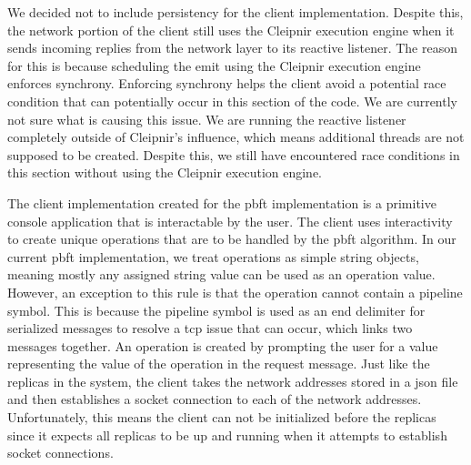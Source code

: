 We decided not to include persistency for the client implementation. Despite this, the network portion of the client still uses the Cleipnir execution engine when it sends incoming replies from the network layer to its reactive listener. The reason for this is because scheduling the emit using the Cleipnir execution engine enforces synchrony. Enforcing synchrony helps the client avoid a potential race condition that can potentially occur in this section of the code. We are currently not sure what is causing this issue. We are running the reactive listener completely outside of Cleipnir’s influence, which means additional threads are not supposed to be created. Despite this, we still have encountered race conditions in this section without using the Cleipnir execution engine.
\fi

The client implementation created for the \ac{pbft} implementation is a primitive console application that is interactable by the user. The client uses interactivity to create unique operations that are to be handled by the \ac{pbft} algorithm. In our current \ac{pbft} implementation, we treat operations as simple string objects, meaning mostly any assigned string value can be used as an operation value. However, an exception to this rule is that the operation cannot contain a pipeline symbol. This is because the pipeline symbol is used as an end delimiter for serialized messages to resolve a \ac{tcp} issue that can occur, which links two messages together. An operation is created by prompting the user for a value representing the value of the operation in the request message. 
Just like the replicas in the system, the client takes the network addresses stored in a \ac{json} file and then establishes a socket connection to each of the network addresses. Unfortunately, this means the client can not be initialized before the replicas since it expects all replicas to be up and running when it attempts to establish socket connections.

